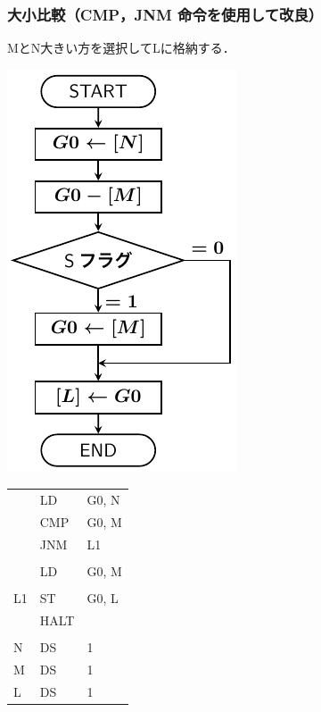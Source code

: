 \documentclass{beamer}                 %
\begin{document}
\begin{frame}
  \frametitle{大小比較（CMP，JNM 命令を使用して改良）}
  MとN大きい方を選択してLに格納する．\\
  \vfill
  \begin{minipage}{0.5\columnwidth}
    \centerline{\includegraphics[scale=0.75]{../Tikz/flowJ.pdf}}
  \end{minipage}
  \begin{minipage}{0.48\columnwidth}
    {\ttfamily\footnotesize
      \begin{tabular}{|l|l|l|}
              & LD     & G0, N    \\
              & CMP    & G0, M    \\
              & JNM    & L1       \\
              &        &          \\
              & LD     & G0, M    \\
              &        &          \\
      L1      & ST     & G0, L    \\
              & HALT   &          \\
              &        &          \\
      N       & DS     & 1        \\
      M       & DS     & 1        \\
      L       & DS     & 1        \\
    \end{tabular}}
    \vfill
  \end{minipage}
\end{frame}
\end{document}
